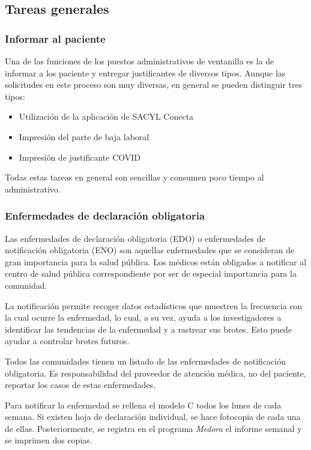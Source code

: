 \subsection{Tareas generales}

\subsubsection{Informar al paciente}

Una de las funciones de los puestos administrativos de ventanilla es la de informar a los paciente y entregar justificantes de diversos tipos. Aunque las solicitudes en este proceso son muy diversas, en general se pueden distinguir tres tipos:

\begin{itemize}
    \item Utilización de la aplicación de SACYL Conecta
    \item Impresión del parte de baja laboral
    \item Impresión de justificante COVID
\end{itemize}

Todas estas tareas en general son sencillas y consumen poco tiempo al administrativo.

\subsubsection{Enfermedades de declaración obligatoria}

Las enfermedades de declaración obligatoria (EDO) o enfermedades de notificación obligatoria (ENO) son aquellas enfermedades que se consideran de gran importancia para la salud pública. Los médicos están obligados a notificar al centro de salud pública correspondiente por ser de especial importancia para la comunidad.

La notificación permite recoger datos estadísticos que muestren la frecuencia con la cual ocurre la enfermedad, lo cual, a su vez, ayuda a los investigadores a identificar las tendencias de la enfermedad y a rastrear sus brotes. Esto puede ayudar a controlar brotes futuros.

Todos las comunidades tienen un listado de las enfermedades de notificación obligatoria. Es responsabilidad del proveedor de atención médica, no del paciente, reportar los casos de estas enfermedades.

Para notificar la enfermedad se rellena el modelo C todos los lunes de cada semana.
Si existen hoja de declaración individual, se hace fotocopia de cada una de ellas.
Posteriormente, se registra en el programa \textit{Medora} el informe semanal y se imprimen dos copias.

